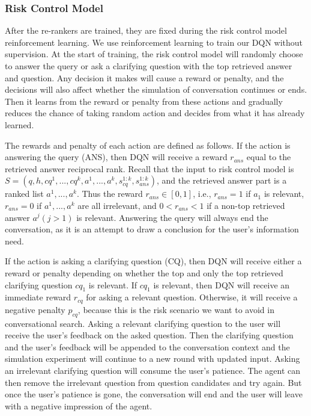 \documentclass[format=acmsmall, review=False, screen=true]{acmart}
\begin{document}
\subsubsection{\textbf{Risk Control Model}}
After the re-rankers are trained, they are fixed during the risk control model reinforcement learning. We use reinforcement learning to train our DQN without supervision. At the start of training, the risk control model will randomly choose to answer the query or ask a clarifying question with the top retrieved answer and question. Any decision it makes will cause a reward or penalty, and the decisions will also affect whether the simulation of conversation continues or ends. Then it learns from the reward or penalty from these actions and gradually reduces the chance of taking random action and decides from what it has already learned. 

The rewards and penalty of each action are defined as follows. If the action is answering the query (ANS), then DQN will receive a reward $r_{ans}$ equal to the retrieved answer reciprocal rank. Recall that the input to risk control model is $S = (q, h, cq^1,..., cq^k, a^1,...,a^k, s_{cq}^{1:k}, s_{ans}^{1:k})$, and the retrieved answer part is a ranked list $a^1,...,a^k$. Thus the reward $r_{ans}\in [0,1]$, i.e., $r_{ans} = 1$ if $a_1$ is relevant, $r_{ans}=0$ if $a^1,...,a^k$ are all irrelevant, and $0<r_{ans}<1$ if a non-top retrieved answer $a^j (j>1)$ is relevant. Answering the query will always end the conversation, as it is an attempt to draw a conclusion for the user's information need. 

If the action is asking a clarifying question (CQ), then DQN will receive either a reward or penalty depending on whether the top and only the top retrieved clarifying question $cq_1$ is relevant. If $cq_1$ is relevant, then DQN will receive an immediate reward $r_{cq}$ for asking a relevant question. Otherwise, it will receive a negative penalty $p_{cq}$, because this is the risk scenario we want to avoid in conversational search. Asking a relevant clarifying question to the user will receive the user's feedback on the asked question. Then the clarifying question and the user's feedback will be appended to the conversation context and the simulation experiment will continue to a new round with updated input. Asking an irrelevant clarifying question will consume the user's patience. The agent can then remove the irrelevant question from question candidates and try again. But once the user's patience is gone, the conversation will end and the user will leave with a negative impression of the agent. 
\end{document}
